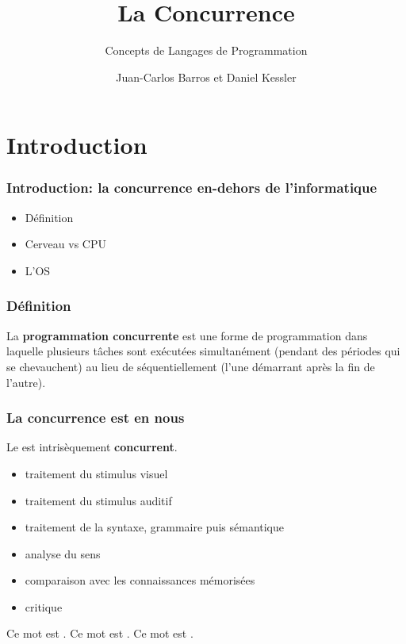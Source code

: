 \documentclass{beamer}
\title{La Concurrence}
\subtitle{Concepts de Langages de Programmation}
\author{Juan-Carlos Barros et Daniel Kessler}
\begin{document}
\begin{frame}
  \titlepage
\end{frame}

\begin{frame}
  \tableofcontents
\end{frame}

\section{Introduction}
\begin{frame}
  \frametitle{Introduction: la concurrence en-dehors de l'informatique}
  \begin{itemize}
  \item Définition
  \item Cerveau vs CPU
  \item L'OS
  \end{itemize}
\end{frame}
\begin{frame}
  \frametitle{Définition} La \textbf{programmation concurrente} est une forme de
  programmation dans laquelle plusieurs tâches sont exécutées simultanément
  (pendant des périodes qui se chevauchent) au lieu de séquentiellement (l’une
  démarrant après la fin de l’autre).
\end{frame}
\begin{frame}
  \frametitle{La concurrence est en nous}
  Le  est intrisèquement \textbf{concurrent}.
  \begin{minipage}{.5\linewidth}
    \begin{itemize}
    \item traitement du stimulus visuel
    \item traitement du stimulus auditif
    \item traitement de la syntaxe, grammaire puis sémantique
    \item analyse du sens
    \item comparaison avec les connaissances mémorisées
    \item critique
    \end{itemize}
  \end{minipage}
  \begin{minipage}{.5\linewidth}
    \LARGE
    \vfill
    Ce mot est \color{green}{rouge}.
    \vfill
    Ce mot est \color{blue}{vert}.
    \vfill
    Ce mot est \color{red}{bleu}.
    \vfill
  \end{minipage}
\end{frame}
\end{document}
